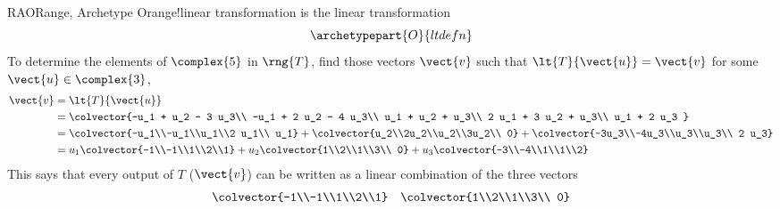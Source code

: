 \begin{example}{RAO}{Range, Archetype O}{range!linear transformation}
 is the linear transformation
%
\begin{equation*}
\archetypepart{O}{ltdefn}
\end{equation*}
%
To determine the elements of $\complex{5}$ in $\rng{T}$, find those vectors $\vect{v}$ such that $\lt{T}{\vect{u}}=\vect{v}$ for some $\vect{u}\in\complex{3}$,
%
\begin{align*}
\vect{v}&=\lt{T}{\vect{u}}\\
&=\colvector{-u_1 + u_2 - 3 u_3\\
-u_1 + 2 u_2 - 4 u_3\\
u_1 + u_2 + u_3\\
2 u_1 + 3 u_2 + u_3\\ 
u_1 + 2 u_3
}\\
&=
\colvector{-u_1\\-u_1\\u_1\\2 u_1\\ u_1}
+
\colvector{u_2\\2u_2\\u_2\\3u_2\\ 0}
+
\colvector{-3u_3\\-4u_3\\u_3\\u_3\\ 2 u_3}\\
&=
u_1\colvector{-1\\-1\\1\\2\\1}
+
u_2\colvector{1\\2\\1\\3\\ 0}
+
u_3\colvector{-3\\-4\\1\\1\\2}
%
\end{align*}
%
This says that every output of $T$ ($\vect{v}$) can be written as a linear combination of the three vectors
%
\begin{align*}
\colvector{-1\\-1\\1\\2\\1}
&&
\colvector{1\\2\\1\\3\\ 0}

\end{align*}
\end{example}
